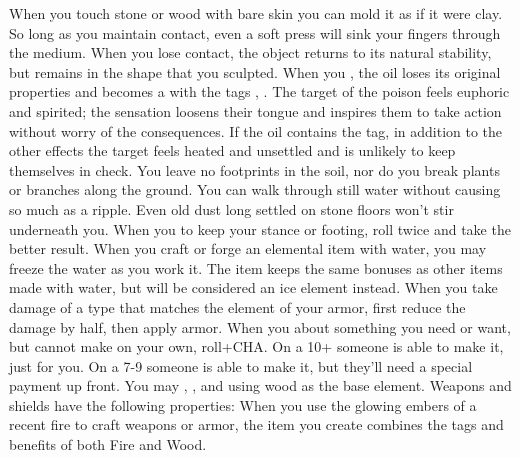 \documentclass[]{dw_playbook}
\begin{document}
    {
            {When you touch stone or wood with bare skin you can mold it as if it were clay.  So long as you maintain contact, even a soft press will sink your fingers through the medium.  When you lose contact, the object returns to its natural stability, but remains in the shape that you sculpted.}
        \gap
            {When you , the oil loses its original properties and becomes a  with the tags , .
            \gap
            The target of the poison feels euphoric and spirited; the sensation loosens their tongue and inspires them to take action without worry of the consequences.
            \gap
            If the oil contains the  tag, in addition to the other effects the target feels heated and unsettled and is unlikely to keep themselves in check.}
        \gap
            {You leave no footprints in the soil, nor do you break plants or branches along the ground.  You can walk through still water without causing so much as a ripple.  Even old dust long settled on stone floors won’t stir underneath you.  When you  to keep your stance or footing, roll twice and take the better result.}
            {When you craft or forge an elemental item with water, you may freeze the water as you work it.  The item keeps the same bonuses as other items made with water, but will be considered an ice element instead.}
        \gap
            {When you take damage of a type that matches the element of your armor, first reduce the damage by half, then apply armor.}
        \gap
            {When you  about something you need or want, but cannot make on your own, roll+CHA.  On a 10+ someone is able to make it, just for you.  On a 7-9 someone is able to make it, but they’ll need a special payment up front.}
        \gap
            {You may , , and  using wood as the base element.  Weapons and shields have the following properties:
            \gapSm
            \gapSm
            }
        \gap
            {When you use the glowing embers of a recent fire to craft weapons or armor, the item you create combines the tags and benefits of both Fire and Wood.}
    }
\end{document}
